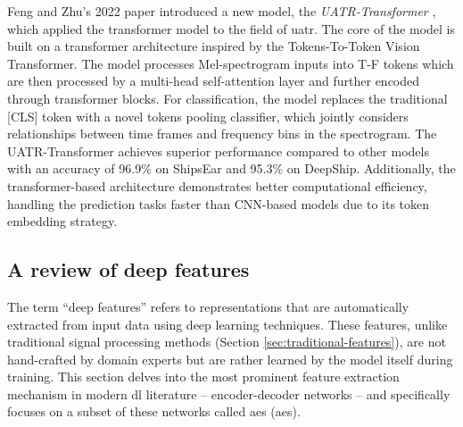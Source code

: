 Feng and Zhu's 2022 paper introduced a new model, the \textit{UATR-Transformer} \cite{feng_transformer-based_2022}, which applied the transformer model to the field of \acrshort{uatr}. The core of the model is built on a transformer architecture inspired by the Tokens-To-Token Vision Transformer. The model processes Mel-spectrogram inputs into T-F tokens which are then processed by a multi-head self-attention layer and further encoded through transformer blocks. For classification, the model replaces the traditional [CLS] token with a novel tokens pooling classifier, which jointly considers relationships between time frames and frequency bins in the spectrogram. The UATR-Transformer achieves superior performance compared to other models with an accuracy of 96.9\% on ShipsEar and 95.3\% on DeepShip. Additionally, the transformer-based architecture demonstrates better computational efficiency, handling the prediction tasks faster than CNN-based models due to its token embedding strategy. 



\subsection{A review of deep features}\label{subsec:deep-features}

The term ``deep features'' refers to representations that are automatically extracted from input data using deep learning techniques. These features, unlike traditional signal processing methods (Section \ref{sec:traditional-features}), are not hand-crafted by domain experts but are rather learned by the model itself during training. This section delves into the most prominent feature extraction mechanism in modern \acrlong{dl} literature -- encoder-decoder networks -- and specifically focuses on a subset of these networks called \acrlong{ae}s (\acrshort{ae}s).

